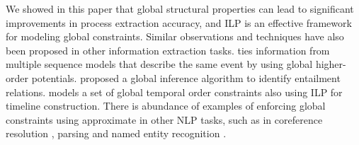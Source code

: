 We showed in this paper that global structural properties can lead to significant improvements in process extraction accuracy, and ILP is an effective framework for modeling global constraints. Similar observations and techniques have also been proposed in other information extraction tasks. 
 ties information from multiple sequence models that describe the same event by using global higher-order potentials. 
 proposed a global inference algorithm to identify entailment relations. 
 models a set of global temporal order constraints also using ILP for timeline construction. 
There is abundance of examples of enforcing global constraints using approximate in other NLP tasks, such as in coreference resolution \cite{Finkel08}, parsing \cite{Rush12} and named entity recognition \cite{Wang13}.
